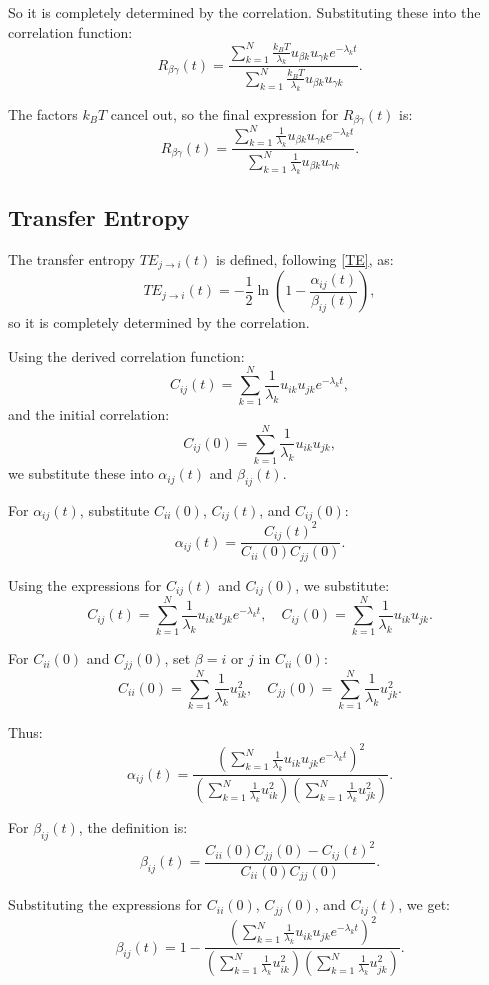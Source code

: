 \documentclass[English, Lau, oneside]{sapthesis}
\begin{document}
So it is completely determined by the correlation.
Substituting these into the correlation function:
\[
R_{\beta\gamma}(t) = \frac{\sum_{k=1}^N \frac{k_B T}{\lambda_k} u_{\beta k} u_{\gamma k} e^{-\lambda_k t}}{\sum_{k=1}^N \frac{k_B T}{\lambda_k} u_{\beta k} u_{\gamma k}}.
\]

The factors \(k_B T\) cancel out, so the final expression for \(R_{\beta\gamma}(t)\) is:
\[
R_{\beta\gamma}(t) = \frac{\sum_{k=1}^N \frac{1}{\lambda_k} u_{\beta k} u_{\gamma k} e^{-\lambda_k t}}{\sum_{k=1}^N \frac{1}{\lambda_k} u_{\beta k} u_{\gamma k}}.
\]


\subsection{Transfer Entropy}

The transfer entropy \(TE_{j \to i}(t)\) is defined, following \eqref{TE}, as:
\[
TE_{j \to i}(t) = -\frac{1}{2} \ln{\left(1 - \frac{\alpha_{ij}(t)}{\beta_{ij}(t)}\right)},
\]
so it is completely determined by the correlation.

Using the derived correlation function:
\[
C_{ij}(t) = \sum_{k=1}^N \frac{1}{\lambda_k} u_{ik} u_{jk} e^{-\lambda_k t},
\]
and the initial correlation:
\[
C_{ij}(0) = \sum_{k=1}^N \frac{1}{\lambda_k} u_{ik} u_{jk},
\]
we substitute these into \(\alpha_{ij}(t)\) and \(\beta_{ij}(t)\).

For \(\alpha_{ij}(t)\), substitute \(C_{ii}(0)\), \(C_{ij}(t)\), and \(C_{ij}(0)\):
\[
\alpha_{ij}(t) = \frac{C_{ij}(t)^2}{C_{ii}(0) C_{jj}(0)}.
\]

Using the expressions for \(C_{ij}(t)\) and \(C_{ij}(0)\), we substitute:
\[
C_{ij}(t) = \sum_{k=1}^N \frac{1}{\lambda_k} u_{ik} u_{jk} e^{-\lambda_k t}, \quad
C_{ij}(0) = \sum_{k=1}^N \frac{1}{\lambda_k} u_{ik} u_{jk}.
\]

For \(C_{ii}(0)\) and \(C_{jj}(0)\), set \(\beta = i\) or \(j\) in \(C_{ii}(0)\):
\[
C_{ii}(0) = \sum_{k=1}^N \frac{1}{\lambda_k} u_{ik}^2, \quad
C_{jj}(0) = \sum_{k=1}^N \frac{1}{\lambda_k} u_{jk}^2.
\]

Thus:
\[
\alpha_{ij}(t) = \frac{\left(\sum_{k=1}^N \frac{1}{\lambda_k} u_{ik} u_{jk} e^{-\lambda_k t}\right)^2}
{\left(\sum_{k=1}^N \frac{1}{\lambda_k} u_{ik}^2\right)\left(\sum_{k=1}^N \frac{1}{\lambda_k} u_{jk}^2\right)}.
\]

For \(\beta_{ij}(t)\), the definition is:
\[
\beta_{ij}(t) = \frac{C_{ii}(0) C_{jj}(0) - C_{ij}(t)^2}{C_{ii}(0) C_{jj}(0)}.
\]

Substituting the expressions for \(C_{ii}(0)\), \(C_{jj}(0)\), and \(C_{ij}(t)\), we get:
\[
\beta_{ij}(t) = 1 - \frac{\left(\sum_{k=1}^N \frac{1}{\lambda_k} u_{ik} u_{jk} e^{-\lambda_k t}\right)^2}
{\left(\sum_{k=1}^N \frac{1}{\lambda_k} u_{ik}^2\right)\left(\sum_{k=1}^N \frac{1}{\lambda_k} u_{jk}^2\right)}.
\]
\end{document}
